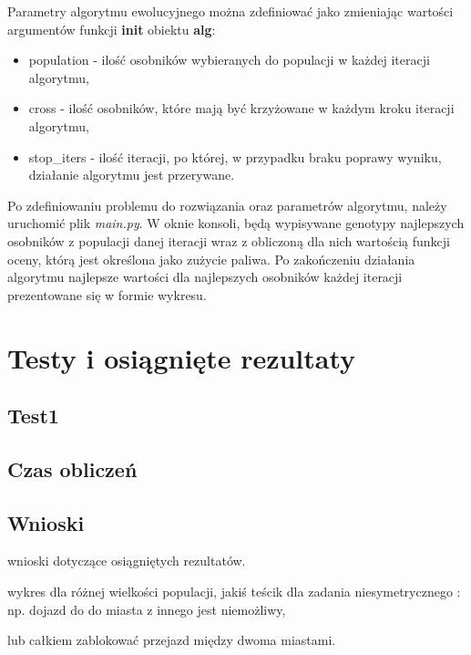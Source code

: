 \documentclass[12pt, oneside, final]{report}
\begin{document}
Parametry algorytmu ewolucyjnego można zdefiniować jako zmieniając wartości argumentów funkcji \textbf{init} obiektu \textbf{alg}:
\begin{itemize}
\item population - ilość osobników wybieranych do populacji w każdej iteracji algorytmu,
\item cross - ilość osobników, które mają być krzyżowane w każdym kroku iteracji algorytmu,
\item stop\_iters - ilość iteracji, po której, w przypadku braku poprawy wyniku, działanie algorytmu jest przerywane.
\end{itemize}

Po zdefiniowaniu problemu do rozwiązania oraz parametrów algorytmu, należy uruchomić plik \textit{main.py}. W oknie konsoli, będą wypisywane genotypy najlepszych osobników z populacji danej iteracji wraz z obliczoną dla nich wartością funkcji oceny, którą jest określona jako zużycie paliwa. %
 Po zakończeniu działania algorytmu najlepsze wartości dla najlepszych osobników każdej iteracji prezentowane się w formie wykresu.

\chapter{Testy i osiągnięte rezultaty}

\section{Test1}

\section{Czas obliczeń}

\section{Wnioski}
wnioski dotyczące osiągniętych rezultatów. 

wykres dla różnej wielkości populacji,
jakiś teścik dla zadania niesymetrycznego : np. dojazd do do miasta z innego jest niemożliwy,

lub całkiem zablokować przejazd między dwoma miastami.
\end{document}
